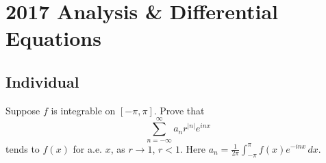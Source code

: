 \section{2017 Analysis \& Differential Equations}

\subsection{Individual}

\begin{exercise}
\label{analysis:2017:1}
Suppose $f$ is integrable on $[-\pi,\pi]$. Prove that 
\[
\sum_{n=-\infty}^{\infty} a_n r^{|n|}e^{inx}
\]
tends to $f(x)$ for a.e. $x$, as $r \to 1$, $r < 1$. Here $a_n = \frac{1}{2\pi}\int_{-\pi}^{\pi}f(x)e^{-inx}\,dx$.
\end{exercise}

